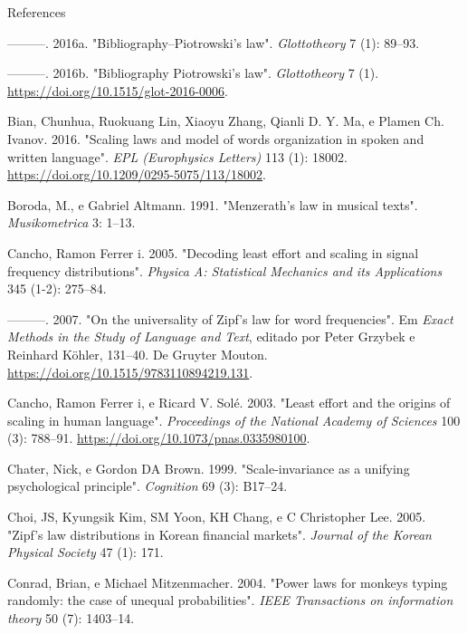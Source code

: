 \documentclass[
  ignorenonframetext,
  aspectratio=169]{beamer}
\newlength{\cslhangindent}
\newlength{\cslentryspacingunit} %
\newenvironment{CSLReferences}[2] %
 {%
  \setlength{\parindent}{0pt}
  \ifodd #1
  \let\oldpar\par
  \def\par{\hangindent=\cslhangindent\oldpar}
  \fi
  \setlength{\parskip}{#2\cslentryspacingunit}
 }%
 {}
\begin{document}
\begin{frame}[allowframebreaks]{References}
\begin{CSLReferences}{1}{0}
\leavevmode{}%
---------. 2016a. {"Bibliography--Piotrowski's law"}.
\emph{Glottotheory} 7 (1): 89--93.

\leavevmode{}%
---------. 2016b. {"Bibliography {\textendash} Piotrowski's law"}.
\emph{Glottotheory} 7 (1). \url{https://doi.org/10.1515/glot-2016-0006}.

\leavevmode{}%
Bian, Chunhua, Ruokuang Lin, Xiaoyu Zhang, Qianli D. Y. Ma, e Plamen Ch.
Ivanov. 2016. {"Scaling laws and model of words organization in spoken
and written language"}. \emph{{EPL} (Europhysics Letters)} 113 (1):
18002. \url{https://doi.org/10.1209/0295-5075/113/18002}.

\leavevmode{}%
Boroda, M., e Gabriel Altmann. 1991. {"Menzerath's law in musical
texts"}. \emph{Musikometrica} 3: 1--13.

\leavevmode{}%
Cancho, Ramon Ferrer i. 2005. {"Decoding least effort and scaling in
signal frequency distributions"}. \emph{Physica A: Statistical Mechanics
and its Applications} 345 (1-2): 275--84.

\leavevmode{}%
---------. 2007. {"On the universality of Zipf's law for word
frequencies"}. Em \emph{Exact Methods in the Study of Language and
Text}, editado por Peter Grzybek e Reinhard Köhler, 131--40. De Gruyter
Mouton. \url{https://doi.org/10.1515/9783110894219.131}.

\leavevmode{}%
Cancho, Ramon Ferrer i, e Ricard V. Solé. 2003. {"Least effort and the
origins of scaling in human language"}. \emph{Proceedings of the
National Academy of Sciences} 100 (3): 788--91.
\url{https://doi.org/10.1073/pnas.0335980100}.

\leavevmode{}%
Chater, Nick, e Gordon DA Brown. 1999. {"Scale-invariance as a unifying
psychological principle"}. \emph{Cognition} 69 (3): B17--24.

\leavevmode{}%
Choi, JS, Kyungsik Kim, SM Yoon, KH Chang, e C Christopher Lee. 2005.
{"Zipf's law distributions in Korean financial markets"}. \emph{Journal
of the Korean Physical Society} 47 (1): 171.

\leavevmode{}%
Conrad, Brian, e Michael Mitzenmacher. 2004. {"Power laws for monkeys
typing randomly: the case of unequal probabilities"}. \emph{IEEE
Transactions on information theory} 50 (7): 1403--14.


\end{CSLReferences}
\end{frame}
\end{document}
